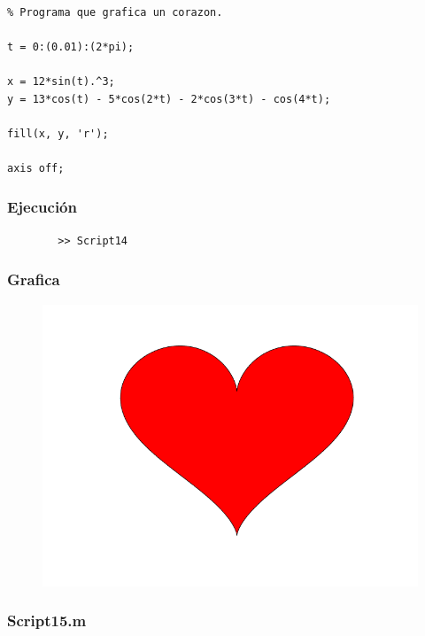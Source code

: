 \documentclass{article}
\begin{document}
	\begin{lstlisting}

% Programa que grafica un corazon.

t = 0:(0.01):(2*pi);

x = 12*sin(t).^3;
y = 13*cos(t) - 5*cos(2*t) - 2*cos(3*t) - cos(4*t);

fill(x, y, 'r');

axis off;

	\end{lstlisting}
	
	\subsubsection{Ejecución}
	
	\begin{lstlisting}
		>> Script14
	\end{lstlisting}
	
	\subsubsection{Grafica}
	
	\begin{figure}[h]
		\centering
		\includegraphics[width=\textwidth]{grafica14.png}
	\end{figure}

	\newpage
	
	\subsubsection{Script15.m}
	
\end{document}

